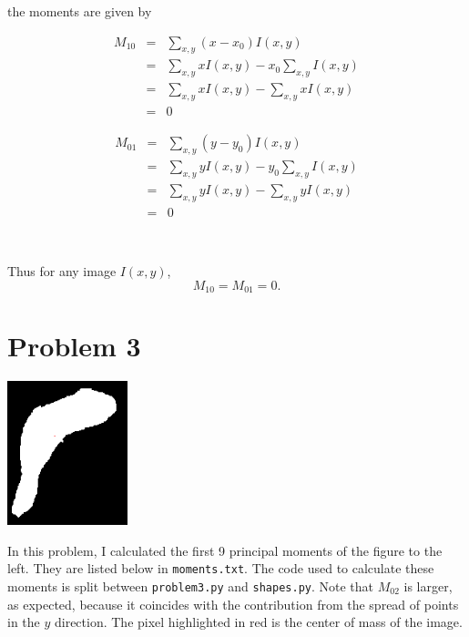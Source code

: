 \documentclass[aps,letterpaper,10pt]{article}
\newcommand{\ttt}{\texttt}
\begin{document}
\noindent the moments are given by\\

\begin{minipage}[c]{.49\textwidth}
\begin{eqnarray*}
M_{10} & = & \sum_{x,y} (x-x_0) I(x,y) \\ 
& = & \sum_{x,y} x I(x,y) - x_0 \sum_{x,y} I(x,y) \\
& = & \sum_{x,y} x I(x,y) - \sum_{x,y} x I(x,y) \\
& = & 0
\end{eqnarray*} 
\end{minipage}
\begin{minipage}[c]{.49\textwidth}
\begin{eqnarray*}
M_{01} & = & \sum_{x,y} (y-y_0) I(x,y) \\ 
& = & \sum_{x,y} y I(x,y) - y_0 \sum_{x,y} I(x,y) \\
& = & \sum_{x,y} y I(x,y) - \sum_{x,y} y I(x,y) \\
& = & 0
\end{eqnarray*}
\end{minipage}\\
\vspace{20px}

\noindent Thus for any image $I(x,y)$, $$M_{10}=M_{01}=0.$$

\newpage
\section{Problem 3}
\begin{minipage}[c]{.3\textwidth}
\centering
\includegraphics[width=3.5cm]{img_moment.png}
\end{minipage}
\begin{minipage}[c]{.7\textwidth}
In this problem, I calculated the first 9 principal moments of the figure to the left. They are listed below in \ttt{moments.txt}.  The code used to calculate these moments is split between \ttt{problem3.py} and \ttt{shapes.py}.  Note that $M_{02}$ is larger, as expected, because it coincides with the contribution from the spread of points in the $y$ direction.  The pixel highlighted in red is the center of mass of the image.

\end{minipage}

\end{document}

